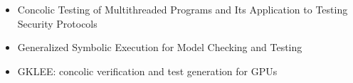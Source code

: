 \documentclass{beamer}
\begin{document}
\begin{frame}
\begin{itemize}
			\color{Paper2Full}  \item Concolic Testing of Multithreaded Programs and	Its Application to Testing Security Protocols
			\color{Paper3Full}  \item Generalized Symbolic Execution for Model Checking and Testing
			\color{Paper4Full}  \item GKLEE: concolic verification and test generation for GPUs
		\end{itemize}
	\end{frame}
	
\end{document}
